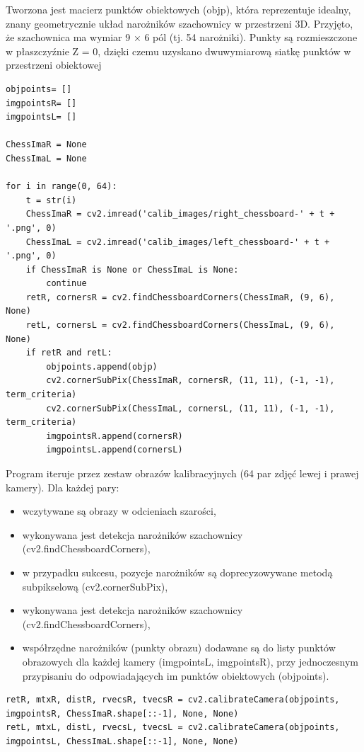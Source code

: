 \documentclass[magisterska]{pracadypl}
\begin{document}
Tworzona jest macierz punktów obiektowych (objp), która reprezentuje idealny, znany geometrycznie układ narożników szachownicy w przestrzeni 3D. Przyjęto, że szachownica ma wymiar 9 × 6 pól (tj. 54 narożniki). Punkty są rozmieszczone w płaszczyźnie Z = 0, dzięki czemu uzyskano dwuwymiarową siatkę punktów w przestrzeni obiektowej

\begin{lstlisting}[style=mypython]
objpoints= []   
imgpointsR= []   
imgpointsL= []

ChessImaR = None
ChessImaL = None

for i in range(0, 64):
    t = str(i)
    ChessImaR = cv2.imread('calib_images/right_chessboard-' + t + '.png', 0)
    ChessImaL = cv2.imread('calib_images/left_chessboard-' + t + '.png', 0)
    if ChessImaR is None or ChessImaL is None:
        continue  
    retR, cornersR = cv2.findChessboardCorners(ChessImaR, (9, 6), None)
    retL, cornersL = cv2.findChessboardCorners(ChessImaL, (9, 6), None)
    if retR and retL:
        objpoints.append(objp)
        cv2.cornerSubPix(ChessImaR, cornersR, (11, 11), (-1, -1), term_criteria)
        cv2.cornerSubPix(ChessImaL, cornersL, (11, 11), (-1, -1), term_criteria)
        imgpointsR.append(cornersR)
        imgpointsL.append(cornersL)
\end{lstlisting}

Program iteruje przez zestaw obrazów kalibracyjnych (64 par zdjęć lewej i prawej kamery). Dla każdej pary:

\begin{itemize}
    \item wczytywane są obrazy w odcieniach szarości,
    \item wykonywana jest detekcja narożników szachownicy (cv2.findChessboardCorners),
    \item w przypadku sukcesu, pozycje narożników są doprecyzowywane metodą subpikselową (cv2.cornerSubPix),
    \item wykonywana jest detekcja narożników szachownicy (cv2.findChessboardCorners),
    \item współrzędne narożników (punkty obrazu) dodawane są do listy punktów obrazowych dla każdej kamery (imgpointsL, imgpointsR), przy jednoczesnym przypisaniu do odpowiadających im punktów obiektowych (objpoints).
\end{itemize}

\begin{lstlisting}[style=mypython]
retR, mtxR, distR, rvecsR, tvecsR = cv2.calibrateCamera(objpoints, imgpointsR, ChessImaR.shape[::-1], None, None)
retL, mtxL, distL, rvecsL, tvecsL = cv2.calibrateCamera(objpoints, imgpointsL, ChessImaL.shape[::-1], None, None)
\end{lstlisting}
\end{document}
